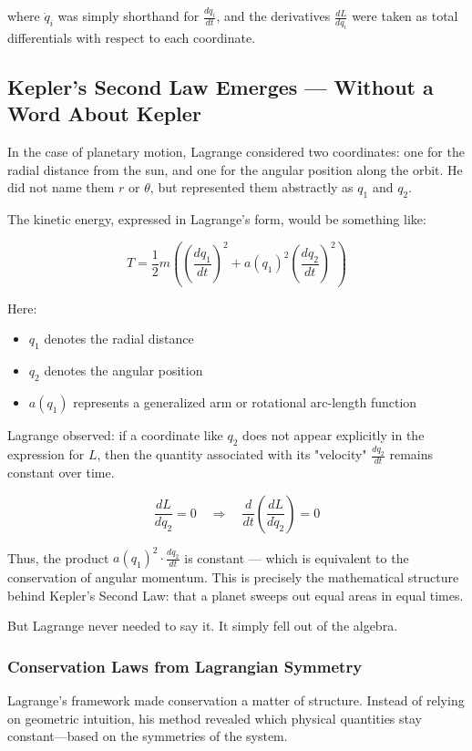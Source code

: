 where \( \dot{q}_i \) was simply shorthand for \( \frac{dq_i}{dt} \), and the derivatives \( \frac{dL}{dq_i} \) were taken as total differentials with respect to each coordinate.

\subsection*{Kepler’s Second Law Emerges — Without a Word About Kepler}

In the case of planetary motion, Lagrange considered two coordinates: one for the radial distance from the sun, and one for the angular position along the orbit. He did not name them \( r \) or \( \theta \), but represented them abstractly as \( q_1 \) and \( q_2 \).

The kinetic energy, expressed in Lagrange's form, would be something like:

\[
T = \frac{1}{2} m \left( \left( \frac{dq_1}{dt} \right)^2 + a(q_1)^2 \left( \frac{dq_2}{dt} \right)^2 \right)
\]

Here:
\begin{itemize}
    \item \( q_1 \) denotes the radial distance
    \item \( q_2 \) denotes the angular position
    \item \( a(q_1) \) represents a generalized arm or rotational arc-length function
\end{itemize}

Lagrange observed: if a coordinate like \( q_2 \) does not appear explicitly in the expression for \( L \), then the quantity associated with its "velocity" \( \frac{dq_2}{dt} \) remains constant over time.

\[
\frac{dL}{dq_2} = 0 \quad \Rightarrow \quad \frac{d}{dt} \left( \frac{dL}{d\dot{q}_2} \right) = 0
\]

Thus, the product \( a(q_1)^2 \cdot \frac{dq_2}{dt} \) is constant — which is equivalent to the conservation of angular momentum. This is precisely the mathematical structure behind Kepler’s Second Law: that a planet sweeps out equal areas in equal times.

But Lagrange never needed to say it. It simply fell out of the algebra.

\subsubsection*{Conservation Laws from Lagrangian Symmetry}

Lagrange's framework made conservation a matter of structure. Instead of relying on geometric intuition, his method revealed which physical quantities stay constant—based on the symmetries of the system.

